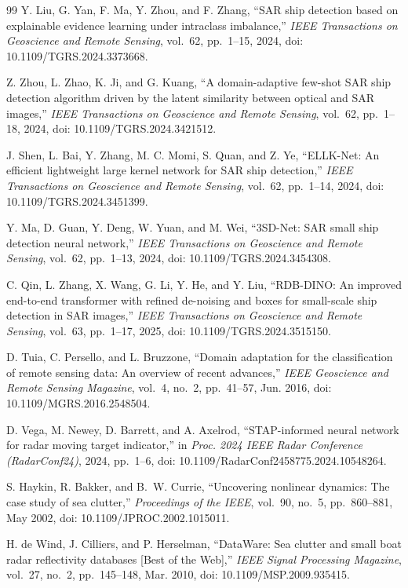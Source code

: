 \documentclass[journal]{IEEEtran}
\begin{document}
\begin{thebibliography}{99}
Y. Liu, G. Yan, F. Ma, Y. Zhou, and F. Zhang, ``SAR ship detection based on explainable evidence learning under intraclass imbalance,'' \emph{IEEE Transactions on Geoscience and Remote Sensing}, vol.~62, pp.~1--15, 2024, doi: 10.1109/TGRS.2024.3373668.

Z. Zhou, L. Zhao, K. Ji, and G. Kuang, ``A domain-adaptive few-shot SAR ship detection algorithm driven by the latent similarity between optical and SAR images,'' \emph{IEEE Transactions on Geoscience and Remote Sensing}, vol.~62, pp.~1--18, 2024, doi: 10.1109/TGRS.2024.3421512.

J. Shen, L. Bai, Y. Zhang, M. C. Momi, S. Quan, and Z. Ye, ``ELLK-Net: An efficient lightweight large kernel network for SAR ship detection,'' \emph{IEEE Transactions on Geoscience and Remote Sensing}, vol.~62, pp.~1--14, 2024, doi: 10.1109/TGRS.2024.3451399.

Y. Ma, D. Guan, Y. Deng, W. Yuan, and M. Wei, ``3SD-Net: SAR small ship detection neural network,'' \emph{IEEE Transactions on Geoscience and Remote Sensing}, vol.~62, pp.~1--13, 2024, doi: 10.1109/TGRS.2024.3454308.

C. Qin, L. Zhang, X. Wang, G. Li, Y. He, and Y. Liu, ``RDB-DINO: An improved end-to-end transformer with refined de-noising and boxes for small-scale ship detection in SAR images,'' \emph{IEEE Transactions on Geoscience and Remote Sensing}, vol.~63, pp.~1--17, 2025, doi: 10.1109/TGRS.2024.3515150.

D. Tuia, C. Persello, and L. Bruzzone, ``Domain adaptation for the classification of remote sensing data: An overview of recent advances,'' \emph{IEEE Geoscience and Remote Sensing Magazine}, vol.~4, no.~2, pp.~41--57, Jun. 2016, doi: 10.1109/MGRS.2016.2548504.

D. Vega, M. Newey, D. Barrett, and A. Axelrod, ``STAP-informed neural network for radar moving target indicator,'' in \emph{Proc. 2024 IEEE Radar Conference (RadarConf24)}, 2024, pp.~1--6, doi: 10.1109/RadarConf2458775.2024.10548264.

S. Haykin, R. Bakker, and B.~W. Currie, ``Uncovering nonlinear dynamics: The case study of sea clutter,'' \emph{Proceedings of the IEEE}, vol.~90, no.~5, pp.~860--881, May 2002, doi: 10.1109/JPROC.2002.1015011.

H. de Wind, J. Cilliers, and P. Herselman, ``DataWare: Sea clutter and small boat radar reflectivity databases [Best of the Web],'' \emph{IEEE Signal Processing Magazine}, vol.~27, no.~2, pp.~145--148, Mar. 2010, doi: 10.1109/MSP.2009.935415.


\end{thebibliography}
\end{document}
